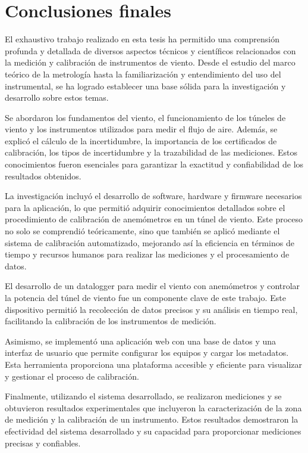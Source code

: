 \section{Conclusiones finales}
El exhaustivo trabajo realizado en esta tesis ha permitido una comprensión profunda y detallada de diversos aspectos técnicos y científicos relacionados con la medición y calibración de instrumentos de viento. Desde el estudio del marco teórico de la metrología hasta la familiarización y entendimiento del uso del instrumental, se ha logrado establecer una base sólida para la investigación y desarrollo sobre estos temas.

Se abordaron los fundamentos del viento, el funcionamiento de los túneles de viento y los instrumentos utilizados para medir el flujo de aire. Además, se explicó el cálculo de la incertidumbre, la importancia de los certificados de calibración, los tipos de incertidumbre y la trazabilidad de las mediciones. Estos conocimientos fueron esenciales para garantizar la exactitud y confiabilidad de los resultados obtenidos.

La investigación incluyó el desarrollo de software, hardware y firmware necesarios para la aplicación, lo que permitió adquirir conocimientos detallados sobre el procedimiento de calibración de anemómetros en un túnel de viento. Este proceso no solo se comprendió teóricamente, sino que también se aplicó mediante el sistema de calibración automatizado, mejorando así la eficiencia en términos de tiempo y recursos humanos para realizar las mediciones y el procesamiento de datos.

El desarrollo de un datalogger para medir el viento con anemómetros y controlar la potencia del túnel de viento fue un componente clave de este trabajo. Este dispositivo permitió la recolección de datos precisos y su análisis en tiempo real, facilitando la calibración de los instrumentos de medición.

Asimismo, se implementó una aplicación web con una base de datos y una interfaz de usuario que permite configurar los equipos y cargar los metadatos. Esta herramienta proporciona una plataforma accesible y eficiente para visualizar y gestionar el proceso de calibración.

Finalmente, utilizando el sistema desarrollado, se realizaron mediciones y se obtuvieron resultados experimentales que incluyeron la caracterización de la zona de medición y la calibración de un instrumento. Estos resultados demostraron la efectividad del sistema desarrollado y su capacidad para proporcionar mediciones precisas y confiables.

